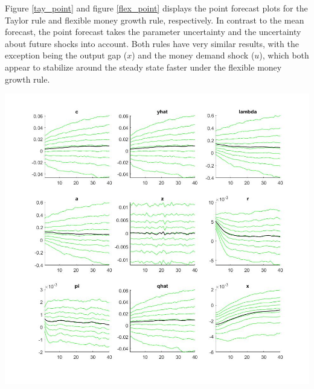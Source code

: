 \documentclass[11pt,preprint, authoryear]{elsarticle}
\let\origfigure\figure
\let\endorigfigure\endfigure
\renewenvironment{figure}[1][2] {
    \expandafter\origfigure\expandafter[H]
} {
    \endorigfigure
}
\numberwithin{equation}{section}
\numberwithin{figure}{section}
\numberwithin{table}{section}
\begin{document}
Figure \ref{tay_point} and figure \ref{flex_point} displays the point
forecast plots for the Taylor rule and flexible money growth rule,
respectively. In contrast to the mean forecast, the point forecast takes
the parameter uncertainty and the uncertainty about future shocks into
account. Both rules have very similar results, with the exception being
the output gap (\(x\)) and the money demand shock (\(u\)), which both
appear to stabilize around the steady state faster under the flexible
money growth rule.

\begin{figure}
    \centering 
    \begin{minipage}[t]{8.2cm} 
        \centering 
        \includegraphics[width=\linewidth]{tay_fore_var1.jpg} 
    \end{minipage} 
    \hspace{0.1cm} 
    \begin{minipage}[t]{8.2cm} 
        \centering 

\end{minipage}
\end{figure}
\end{document}

